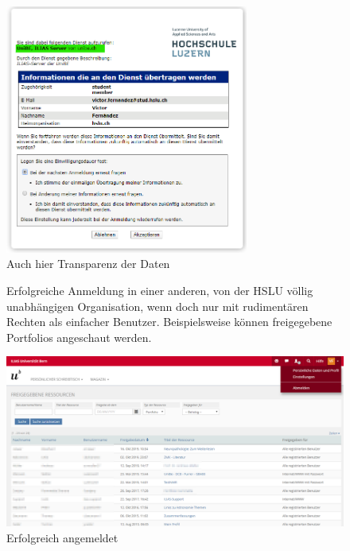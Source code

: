 \documentclass[10pt,a4paper]{article}
\begin{document}
\begin{figure}[H]
    \begin{center}
    \includegraphics[width=8cm]{images/switchaai6.png}
    \caption{Auch hier Transparenz der Daten}
    \label{switchaai6}
    \end{center}
\end{figure}

\begin{figure}[H]
    Erfolgreiche Anmeldung in einer anderen, von der HSLU völlig unabhängigen Organisation, wenn doch nur mit rudimentären Rechten als einfacher Benutzer. Beispielsweise können freigegebene Portfolios angeschaut werden.
    \begin{center}
    \includegraphics[width=16cm]{images/switchaai7.png}
    \caption{Erfolgreich angemeldet}
    \label{switchaai7}
    \end{center}
\end{figure}

\pagebreak
\end{document}
